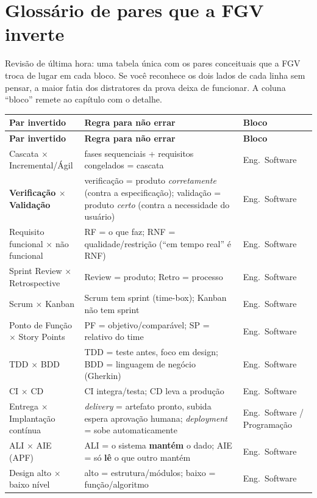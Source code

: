 \chapter{Glossário de pares que a FGV inverte}

Revisão de última hora: uma tabela única com os pares conceituais que a FGV
troca de lugar em cada bloco. Se você reconhece os dois lados de cada linha
sem pensar, a maior fatia dos distratores da prova deixa de funcionar. A
coluna ``bloco'' remete ao capítulo com o detalhe.

\begin{longtable}{@{}p{3.3cm}p{6.1cm}p{2.6cm}@{}}
\toprule
\textbf{Par invertido} & \textbf{Regra para não errar} & \textbf{Bloco} \\
\midrule
\endfirsthead
\toprule
\textbf{Par invertido} & \textbf{Regra para não errar} & \textbf{Bloco} \\
\midrule
\endhead
Cascata $\times$ Incremental/Ágil & fases sequenciais + requisitos congelados = cascata & Eng.\ Software \\
\textbf{Verificação $\times$ Validação} & verificação = produto \emph{corretamente} (contra a especificação); validação = produto \emph{certo} (contra a necessidade do usuário) & Eng.\ Software \\
Requisito funcional $\times$ não funcional & RF = o que faz; RNF = qualidade/restrição (``em tempo real'' é RNF) & Eng.\ Software \\
Sprint Review $\times$ Retrospective & Review = produto; Retro = processo & Eng.\ Software \\
Scrum $\times$ Kanban & Scrum tem sprint (time-box); Kanban não tem sprint & Eng.\ Software \\
Ponto de Função $\times$ Story Points & PF = objetivo/comparável; SP = relativo do time & Eng.\ Software \\
TDD $\times$ BDD & TDD = teste antes, foco em design; BDD = linguagem de negócio (Gherkin) & Eng.\ Software \\
CI $\times$ CD & CI integra/testa; CD leva a produção & Eng.\ Software \\
Entrega $\times$ Implantação contínua & \emph{delivery} = artefato pronto, subida espera aprovação humana; \emph{deployment} = sobe automaticamente & Eng.\ Software / Programação \\
ALI $\times$ AIE (APF) & ALI = o sistema \textbf{mantém} o dado; AIE = só \textbf{lê} o que outro mantém & Eng.\ Software \\
Design alto $\times$ baixo nível & alto = estrutura/módulos; baixo = função/algoritmo & Eng.\ Software \\

\end{longtable}

